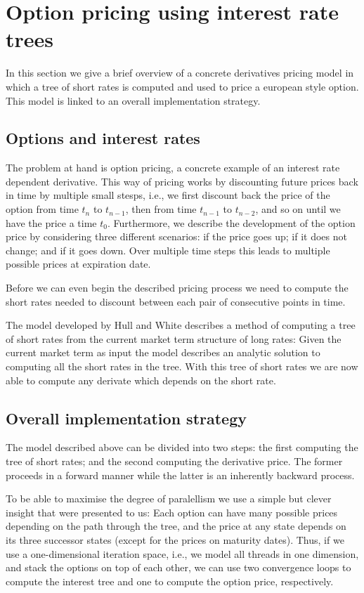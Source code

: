 \section{Option pricing using interest rate trees}

In this section we give a brief overview of a concrete
derivatives pricing model \cite{HullWhite94} in which a tree
of short rates is computed and used to price a european
style option. This model is linked to an overall
implementation strategy.

\subsection{Options and interest rates}

The problem at hand is option pricing, a concrete example of
an interest rate dependent derivative. This way of pricing
works by discounting future prices back in time by multiple
small stesps, i.e., we first discount back the price of the
option from time $t_{n}$ to $t_{n-1}$, then from time
$t_{n-1}$ to $t_{n-2}$, and so on until we have the price a
time $t_0$. Furthermore, we describe the development of the
option price by considering three different scenarios: if
the price goes up; if it does not change; and if it goes
down. Over multiple time steps this leads to multiple
possible prices at expiration date.

Before we can even begin the described pricing process we
need to compute the short rates needed to discount between
each pair of consecutive points in time.

The model developed by Hull and White describes a method of
computing a tree of short rates from the current market term
structure of long rates: Given the current market term as
input the model describes an analytic solution to computing
all the short rates in the tree. With this tree of short
rates we are now able to compute any derivate which depends
on the short rate.


\subsection{Overall implementation strategy}

The model described above can be divided into two steps: the
first computing the tree of short rates; and the second
computing the derivative price. The former proceeds in a
forward manner while the latter is an inherently backward
process.

To be able to maximise the degree of paralellism we use a
simple but clever insight that were presented to us: Each
option can have many possible prices depending on the path
through the tree, and the price at any state depends on its
three successor states (except for the prices on maturity
dates). Thus, if we use a one-dimensional iteration space,
i.e., we model all threads in one dimension, and stack the
options on top of each other, we can use two convergence
loops to compute the interest tree and one to compute the
option price, respectively.

